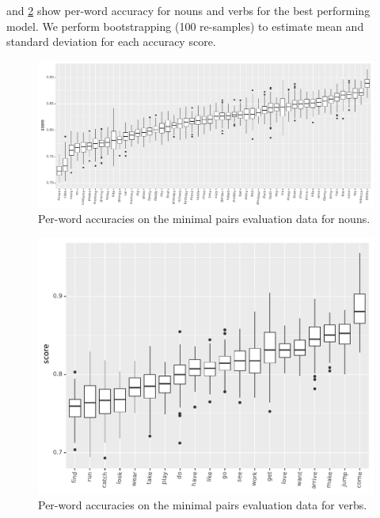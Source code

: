  and
\ref{fig:accuracy_targeted_triplets_verbs} show per-word
accuracy for nouns and verbs for the best performing model.
We perform bootstrapping (100 re-samples) to estimate mean and standard 
deviation for each accuracy score.


\begin{figure}[htb]
  \centering
  \includegraphics[width=\textwidth]{results/targeted_triplets/acc_per_word_NOUN.pdf}
  \caption{Per-word accuracies on the minimal pairs evaluation data for nouns.}
  \label{fig:accuracy_targeted_triplets_nouns}
\end{figure}

\begin{figure}[htb]
  \centering
  \includegraphics[width=\linewidth]{results/targeted_triplets/acc_per_word_VERB.pdf}
  \caption{Per-word accuracies on the minimal pairs evaluation data
    for verbs.}
  \label{fig:accuracy_targeted_triplets_verbs}
\end{figure}

